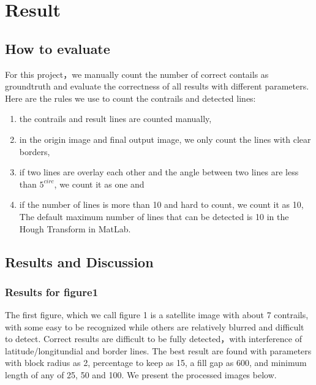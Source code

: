 \chapter{Result}

\section{How to evaluate}
For this project，we manually count the number of correct contails as groundtruth  and 
evaluate the correctness of all results with different parameters. Here are the 
rules we use to count the contrails and detected lines:
\begin{enumerate}
    \item the contrails and result lines are counted manually,
    \item in the origin image and final output image, we only count the lines 
          with clear borders,
    \item if two lines are overlay each other and the angle between two 
          lines are less than $5^{circ}$, we count it as one and
    \item if the number of lines is more than 10 and hard to count, we count 
          it as 10, The default maximum number of lines that can be detected 
          is 10 in the Hough Transform in MatLab.
\end{enumerate}

\section{Results and Discussion}

\subsection{Results for figure1}

The first figure, which we call figure 1 is a satellite image with about 7 contrails, 
with some easy to be recognized while others are relatively blurred and difficult 
to detect. Correct results are difficult to be fully detected，with interference 
of latitude/longitundial and border lines.
The best result are found with parameters with block radius as 2, percentage 
to keep as 15, a fill gap as 600, and minimum length of any of 25, 50 and 100. 
We present the processed images below.

